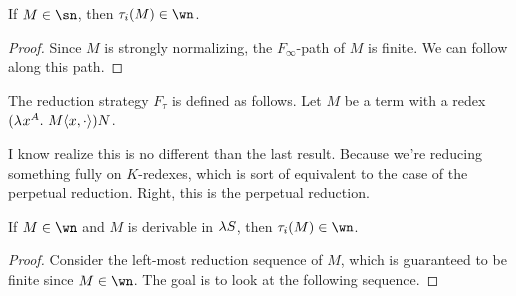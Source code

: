 \documentclass{article}
\begin{document}
\begin{lemma}
If $M \in \sn$, then $\tau_i(M) \in \wn$.
\end{lemma}

\begin{proof}
Since $M$ is strongly normalizing, the $F_\infty$-path of $M$ is finite.
We can follow along this path.
\end{proof}

\begin{definition}
The reduction strategy $F_\tau$ is defined as follows.
Let $M$ be a term with a redex $(\lambda^{} x^{A}. \ M\langle x, \cdot \rangle)N$.
\end{definition}

I know realize this is no different than the last result.
Because we're reducing something fully on $K$-redexes, which is sort of equivalent to the case of the perpetual reduction.
Right, this is the perpetual reduction.

\begin{lemma}
If $M \in \wn$ and $M$ is derivable in $\lambda S$, then $\tau_i(M) \in \wn$.
\end{lemma}

\begin{proof}
Consider the left-most reduction sequence of $M$, which is guaranteed to be finite since $M \in \wn$.
The goal is to look at the following sequence.
\end{proof}



\end{document}
